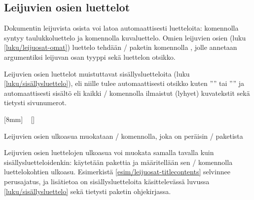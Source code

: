 \subsection{Leijuvien osien luettelot}
\label{luku/leijuosat-luettelot}

Dokumentin leijuvista osista voi latoa automaattisesti luetteloita:
komennolla  syntyy taulukkoluettelo ja komennolla
 kuvaluettelo. Omien leijuvien osien (luku
\ref{luku/leijuosat-omat}) luettelo tehdään \-/
paketin komennolla , jolle annetaan argumentiksi
leijuvan osan tyyppi sekä luettelon otsikko.

\begin{koodilohkosis}
\listoftables                  %
\listoffigures                 %
\end{koodilohkosis}

\noindent
Leijuvien osien luettelot muistuttavat sisällysluetteloita (luku
\ref{luku/sisällysluettelo}), eli niille tulee automaattisesti otsikko
kuten ''\listtablename'' tai ''\listfigurename'' ja automaattisesti
sisältö eli kaikki \-/ komennolla ilmaistut (lyhyet)
kuvatekstit sekä tietysti sivunumerot.

\begin{esimerkki*}

\begin{koodilohko}
[8mm]                                       %
{\addvspace{3bp}\rmfamily\small}            %
{\contentslabel{8mm}}                       %
{}                                          %
{~\small{}\contentspage}   %
[]                                          %
\end{koodilohko}
  \caption{Leijuvien osien ulkoasua muokataan \-/
    komennolla, joka on peräisin \-/ paketista}
  \label{esim/leijuosat-titlecontents}
\end{esimerkki*}

Leijuvien osien luettelojen ulkoasua voi muokata samalla tavalla kuin
sisällysluetteloidenkin: käytetään pakettia  ja
määritellään sen \-/ komennolla luettelokohtien
ulkoasu. Esimerkistä \ref{esim/leijuosat-titlecontents} selvinnee
perusajatus, ja lisätietoa on sisällysluetteloita käsittelevässä luvussa
\ref{luku/sisällysluettelo} sekä tietysti paketin ohjekirjassa.

